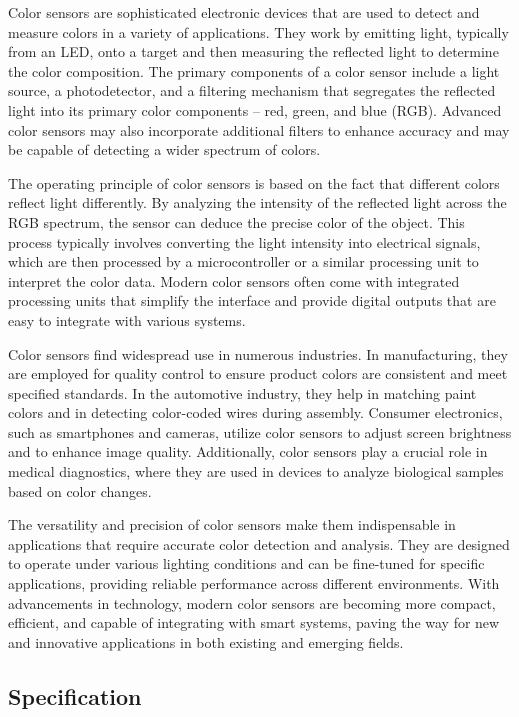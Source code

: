 Color sensors are sophisticated electronic devices that are used to detect and measure colors in a variety of applications. They work by emitting light, typically from an LED, onto a target and then measuring the reflected light to determine the color composition. The primary components of a color sensor include a light source, a photodetector, and a filtering mechanism that segregates the reflected light into its primary color components – red, green, and blue (RGB). Advanced color sensors may also incorporate additional filters to enhance accuracy and may be capable of detecting a wider spectrum of colors.

The operating principle of color sensors is based on the fact that different colors reflect light differently. By analyzing the intensity of the reflected light across the RGB spectrum, the sensor can deduce the precise color of the object. This process typically involves converting the light intensity into electrical signals, which are then processed by a microcontroller or a similar processing unit to interpret the color data. Modern color sensors often come with integrated processing units that simplify the interface and provide digital outputs that are easy to integrate with various systems.

Color sensors find widespread use in numerous industries. In manufacturing, they are employed for quality control to ensure product colors are consistent and meet specified standards. In the automotive industry, they help in matching paint colors and in detecting color-coded wires during assembly. Consumer electronics, such as smartphones and cameras, utilize color sensors to adjust screen brightness and to enhance image quality. Additionally, color sensors play a crucial role in medical diagnostics, where they are used in devices to analyze biological samples based on color changes.

The versatility and precision of color sensors make them indispensable in applications that require accurate color detection and analysis. They are designed to operate under various lighting conditions and can be fine-tuned for specific applications, providing reliable performance across different environments. With advancements in technology, modern color sensors are becoming more compact, efficient, and capable of integrating with smart systems, paving the way for new and innovative applications in both existing and emerging fields.



\subsection{Specification}
